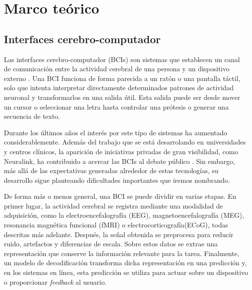 \chapter{Marco teórico}

\section{Interfaces cerebro-computador}

Las interfaces cerebro-computador (BCIs) son sistemas que establecen un canal de comunicación entre la actividad cerebral de una persona
y un dispositivo externo \cite{wolpaw2002bci}. Una BCI funciona de forma parecida a un ratón o una pantalla táctil, solo que intenta interpretar directamente determinados patrones de actividad neuronal y transformarlos en una salida útil. Esta salida puede ser desde mover un cursor o seleccionar una letra hasta controlar una prótesis o generar una secuencia de texto.

Durante los últimos años el interés por este tipo de sistemas ha aumentado considerablemente. Además del trabajo que se está desarrolando en universidades y centros clínicos, la aparición de iniciativas privadas de gran visibilidad, como Neuralink, ha contribuido a acercar las BCIs al debate público \cite{musk2019neuralink}. Sin embargo, más allá de las expectativas generadas alrededor de estas tecnologías, su desarrollo sigue planteando dificultades importantes que iremos nombrando.

De forma más o menos general, una BCI se puede dividir en varias etapas. En primer lugar, la actividad cerebral se registra mediante una modalidad de adquisición, como la electroencefalografía (EEG), magnetoencefalografía (MEG), resonancia magnética funcional (fMRI) o electrocorticografía(ECoG), todas descritas más adelante. Después, la señal obtenida se preprocesa para reducir ruido, artefactos y diferencias de escala. Sobre estos datos se extrae una representación que conserve la información relevante para la tarea. Finalmente, un modelo de decodificación transforma dicha representación en una predicción y, en los sistemas en línea, esta predicción se utiliza para actuar sobre un dispositivo o proporcionar \emph{feedback} al usuario.


